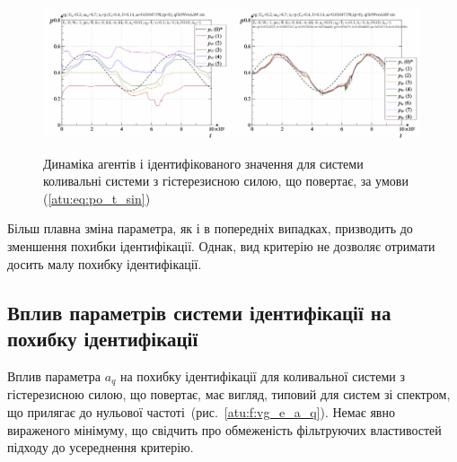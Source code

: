 \begin{figure}[ht!]
\begin{center}
  \includegraphics[width=0.49\textwidth]{p/cha/vg/vg_id-p_t_pi_ql3rlWvnAAW_sin.png}
  \hfill
  \includegraphics[width=0.49\textwidth]{p/cha/vg/vg_id-p_t_p_ql3rlWvnAAW_sin.png}
\end{center}
\caption{Динаміка агентів і ідентифікованого значення для системи коливальні системи з гістерезисною силою, що повертає, за умови (\ref{atu:eq:po_t_sin})}
\label{atu:f:vg_id_sin}
\end{figure}

Більш плавна зміна параметра, як і в попередніх випадках,
призводить до зменшення похибки ідентифікації. Однак,
вид критерію не дозволяє отримати досить малу похибку
ідентифікації.




\subsection{Вплив параметрів системи ідентифікації на похибку ідентифікації} %

Вплив параметра
$ a_q $ на похибку ідентифікації для коливальної системи з
гістерезисною силою, що повертає, має вигляд, типовий для систем зі
спектром, що прилягає до нульової частоті~(рис.~\ref{atu:f:vg_e_a_q}). Немає
явно вираженого мінімуму, що свідчить про обмеженість
фільтруючих властивостей підходу до усереднення критерію.

